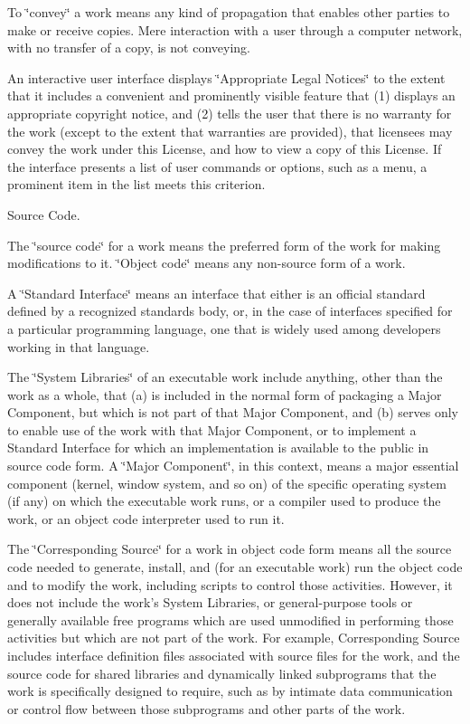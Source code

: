 To \char`\"{}convey\char`\"{} a work means any kind of propagation that enables other parties to make or receive copies. Mere interaction with a user through a computer network, with no transfer of a copy, is not conveying.

An interactive user interface displays \char`\"{}\-Appropriate Legal Notices\char`\"{} to the extent that it includes a convenient and prominently visible feature that (1) displays an appropriate copyright notice, and (2) tells the user that there is no warranty for the work (except to the extent that warranties are provided), that licensees may convey the work under this License, and how to view a copy of this License. If the interface presents a list of user commands or options, such as a menu, a prominent item in the list meets this criterion.


\begin{DoxyEnumerate}
\item Source Code.
\end{DoxyEnumerate}

The \char`\"{}source code\char`\"{} for a work means the preferred form of the work for making modifications to it. \char`\"{}\-Object code\char`\"{} means any non-\/source form of a work.

A \char`\"{}\-Standard Interface\char`\"{} means an interface that either is an official standard defined by a recognized standards body, or, in the case of interfaces specified for a particular programming language, one that is widely used among developers working in that language.

The \char`\"{}\-System Libraries\char`\"{} of an executable work include anything, other than the work as a whole, that (a) is included in the normal form of packaging a Major Component, but which is not part of that Major Component, and (b) serves only to enable use of the work with that Major Component, or to implement a Standard Interface for which an implementation is available to the public in source code form. A \char`\"{}\-Major Component\char`\"{}, in this context, means a major essential component (kernel, window system, and so on) of the specific operating system (if any) on which the executable work runs, or a compiler used to produce the work, or an object code interpreter used to run it.

The \char`\"{}\-Corresponding Source\char`\"{} for a work in object code form means all the source code needed to generate, install, and (for an executable work) run the object code and to modify the work, including scripts to control those activities. However, it does not include the work's System Libraries, or general-\/purpose tools or generally available free programs which are used unmodified in performing those activities but which are not part of the work. For example, Corresponding Source includes interface definition files associated with source files for the work, and the source code for shared libraries and dynamically linked subprograms that the work is specifically designed to require, such as by intimate data communication or control flow between those subprograms and other parts of the work.

